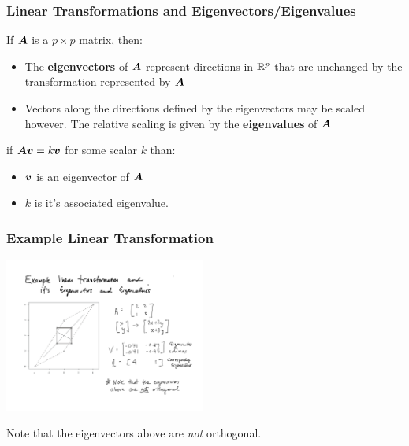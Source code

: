 \documentclass{beamer}
\begin{document}
\begin{frame}
  \frametitle{Linear Transformations and Eigenvectors/Eigenvalues}

If $\bm{A}$ is a $p \times p$ matrix, then:

\begin{itemize}
\item The \textbf{eigenvectors} of $\bm{A}$ represent directions in $\mathbb{R}^p$ that are unchanged by the transformation represented by $\bm{A}$

\item Vectors along the directions defined by the eigenvectors may be scaled however. The relative scaling is given by the \textbf{eigenvalues} of $\bm{A}$

\end{itemize}
\medskip

if $\bm{A}\bm{v} = k\bm{v}$ for some scalar $k$ than:
\begin{itemize}
\item  $\bm{v}$ is an eigenvector of $\bm{A}$ 
\item $k$ is it's associated eigenvalue.
\end{itemize}

\end{frame}
\begin{frame}
  \frametitle{Example Linear Transformation}

\begin{center}
\includegraphics[height=2in]{eigen-example}
\medskip

Note that the eigenvectors above are \emph{not} orthogonal.

\end{center}  

\end{frame}
\end{document}
